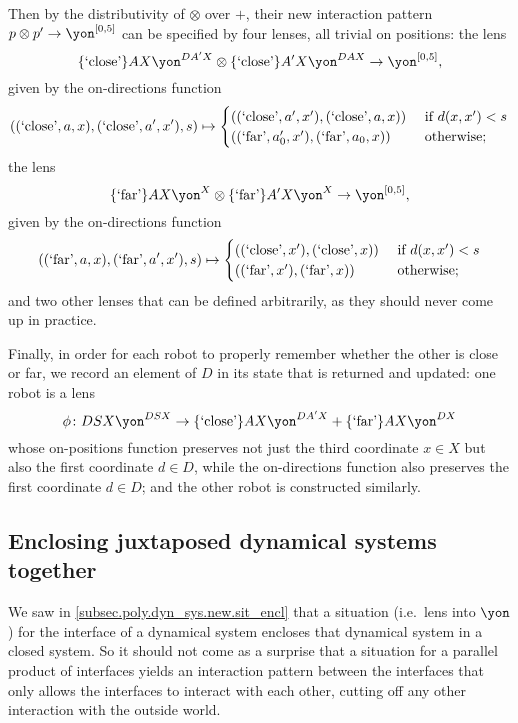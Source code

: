 \documentclass[Book-Poly]{subfiles}
\begin{document}
\begin{exercise}
\begin{solution}
\begin{enumerate}
    Then by the distributivity of $\otimes$ over $+$, their new interaction pattern $p\otimes p'\to\yon^{[0,5]}$ can be specified by four lenses, all trivial on positions: the lens
    \[
        \{\text{`close'}\}AX\yon^{DA'X}\otimes\{\text{`close'}\}A'X\yon^{DAX}\to\yon^{[0,5]},
    \]
    given by the on-directions function
    \[
        ((\text{`close'},a,x),(\text{`close'},a',x'),s)\mapsto
          \begin{cases}
          	((\text{`close'},a',x'),(\text{`close'},a,x))&\textnormal{ if }d(x,x')<s\\
          	((\text{`far'},a'_0,x'),(\text{`far'},a_0,x))&\textnormal{ otherwise};
          \end{cases}
    \]
    the lens
    \[
        \{\text{`far'}\}AX\yon^X\otimes\{\text{`far'}\}A'X\yon^X\to\yon^{[0,5]},
    \]
    given by the on-directions function
    \[
        ((\text{`far'},a,x),(\text{`far'},a',x'),s)\mapsto
          \begin{cases}
          	((\text{`close'},x'),(\text{`close'},x))&\textnormal{ if }d(x,x')<s\\
          	((\text{`far'},x'),(\text{`far'},x))&\textnormal{ otherwise};
          \end{cases}
    \]
    and two other lenses that can be defined arbitrarily, as they should never come up in practice.
    
    Finally, in order for each robot to properly remember whether the other is close or far, we record an element of $D$ in its state that is returned and updated: one robot is a lens
    \[
        \phi\colon DSX\yon^{DSX}\to \{\text{`close'}\}AX\yon^{DA'X}+\{\text{`far'}\}AX\yon^{DX}
    \]
    whose on-positions function preserves not just the third coordinate $x\in X$ but also the first coordinate $d\in D$, while the on-directions function also preserves the first coordinate $d\in D$; and the other robot is constructed similarly.
\end{enumerate}
\end{solution}
\end{exercise}

\subsection{Enclosing juxtaposed dynamical systems together}

We saw in \cref{subsec.poly.dyn_sys.new.sit_encl} that a situation (i.e.\ lens into $\yon$) for the interface of a dynamical system encloses that dynamical system in a closed system.
So it should not come as a surprise that a situation for a parallel product of interfaces yields an interaction pattern between the interfaces that only allows the interfaces to interact with each other, cutting off any other interaction with the outside world.
\end{document}
